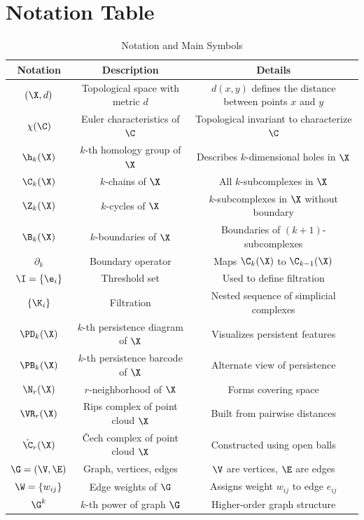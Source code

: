 
\section{Notation Table}


\begin{table}[h!]
\footnotesize
\centering
\caption{Notation and Main Symbols \label{notations}}
\begin{tabular}{ccc}
\toprule
\textbf{Notation} & \textbf{Description} & \textbf{Details} \\
\midrule
$(\X, d)$ & Topological space with metric $d$ & $d(x, y)$ defines the distance between points $x$ and $y$ \\
$\chi(\C)$ & Euler characteristics of $\C$ & Topological invariant to characterize $\C$ \\
$\h_k(\X)$ & $k$-th homology group of $\X$ & Describes $k$-dimensional holes in $\X$ \\
$\C_k(\X)$ & $k$-chains of $\X$ & All $k$-subcomplexes in $\X$ \\
$\Z_k(\X)$ &  $k$-cycles of $\X$ & $k$-subcomplexes in $\X$ without boundary \\
$\B_k(\X)$ & $k$-boundaries of $\X$ & Boundaries of $(k+1)$-subcomplexes \\
$\partial_k$ & Boundary operator & Maps $\C_k(\X)$ to $\C_{k-1}(\X)$\\
$\I=\{\e_i\}$ & Threshold set & Used to define filtration \\
$\{\K_i\}$ & Filtration & Nested sequence of simplicial complexes \\
$\PD_k(\X)$ & $k$-th persistence diagram of $\X$ & Visualizes persistent features \\
$\PB_k(\X)$ & $k$-th persistence barcode of $\X$ & Alternate view of persistence \\
$\N_r(\X)$ & $r$-neighborhood of $\X$ & Forms covering space \\
$\VR_r(\X)$ & Rips complex of point cloud $\X$ & Built from pairwise distances \\
$\check\C_r(\X)$ & \v{C}ech complex of point cloud $\X$ & Constructed using open balls \\
$\G=(\V, \E)$ & Graph, vertices, edges & $\V$ are vertices, $\E$ are edges \\
$\W=\{w_{ij}\}$ & Edge weights of $\G$ & Assigns weight $w_{ij}$ to edge $e_{ij}$ \\
$\G^k$ & $k$-th power of graph $\G$ & Higher-order graph structure \\

\end{tabular}
\end{table}

